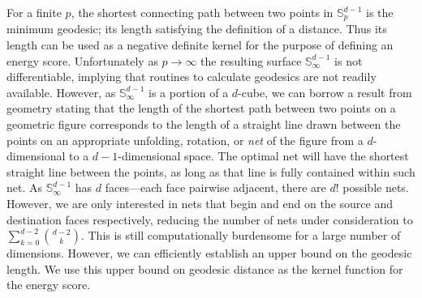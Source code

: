 For a finite $p$, the shortest connecting path between two points in ${\mathbb S}_p^{d-1}$
  is the minimum geodesic; its length satisfying the definition of a distance.  Thus its
  length can be used as a negative definite kernel for the purpose of defining an energy
  score. Unfortunately as $p\to\infty$ the resulting surface ${\mathbb S}_{\infty}^{d-1}$
  is not differentiable, implying that routines to calculate geodesics are not readily
  available.  However, as ${\mathbb S}_{\infty}^{d-1}$ is a portion of a $d$-cube, we
  can borrow a result from geometry \citep{pappas1989} stating that the length of the
  shortest path between two points on a geometric figure corresponds to the length of a
  straight line drawn between the points on an appropriate unfolding, rotation, or 
  \emph{net} of the figure from a $d$-dimensional to a $d-1$-dimensional space.  The optimal 
  net will have the shortest straight line between the points, as long as that line is fully 
  contained within such net. As ${\mathbb S}_{\infty}^{d-1}$ has $d$ faces---each face 
  pairwise adjacent, there are $d!$ possible nets.  However, we are only interested in nets 
  that begin and end on the source and destination faces respectively, reducing the number 
  of nets under consideration to $\sum_{k = 0}^{d-2}\binom{d-2}{k}$.  This is still 
  computationally burdensome for a large number of dimensions.  
  However, we can efficiently establish an upper bound on the geodesic 
  length.  We use this upper bound on geodesic distance as the kernel function for
  the energy score.

